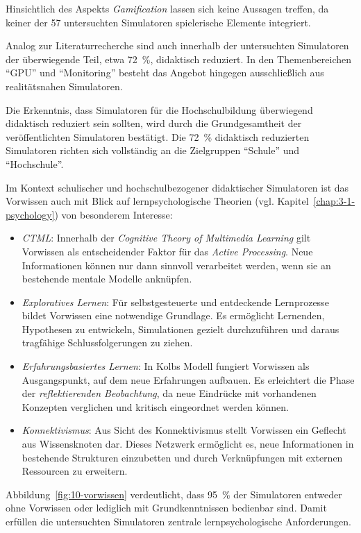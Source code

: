 Hinsichtlich des Aspekts \textit{Gamification} lassen sich keine Aussagen treffen, da keiner der 57 untersuchten Simulatoren spielerische Elemente integriert.

Analog zur Literaturrecherche sind auch innerhalb der untersuchten Simulatoren der überwiegende Teil, etwa 72~\%, didaktisch reduziert. In den Themenbereichen \enquote{GPU} und \enquote{Monitoring} besteht das Angebot hingegen ausschließlich aus realitätsnahen Simulatoren.

Die Erkenntnis, dass Simulatoren für die Hochschulbildung überwiegend didaktisch reduziert sein sollten, wird durch die Grundgesamtheit der veröffentlichten Simulatoren bestätigt. Die 72~\% didaktisch reduzierten Simulatoren richten sich vollständig an die Zielgruppen \enquote{Schule} und \enquote{Hochschule}.

Im Kontext schulischer und hochschulbezogener didaktischer Simulatoren ist das Vorwissen auch mit Blick auf lernpsychologische Theorien (vgl. Kapitel~\ref{chap:3-1-psychology}) von besonderem Interesse:

\begin{itemize}
    \item \textit{\ac{CTML}}: Innerhalb der \textit{Cognitive Theory of Multimedia Learning} gilt Vorwissen als entscheidender Faktor für das \textit{Active Processing}. Neue Informationen können nur dann sinnvoll verarbeitet werden, wenn sie an bestehende mentale Modelle anknüpfen.
    \item \textit{Exploratives Lernen}: Für selbstgesteuerte und entdeckende Lernprozesse bildet Vorwissen eine notwendige Grundlage. Es ermöglicht Lernenden, Hypothesen zu entwickeln, Simulationen gezielt durchzuführen und daraus tragfähige Schlussfolgerungen zu ziehen.
    \item \textit{Erfahrungsbasiertes Lernen}: In Kolbs Modell fungiert Vorwissen als Ausgangspunkt, auf dem neue Erfahrungen aufbauen. Es erleichtert die Phase der \textit{reflektierenden Beobachtung}, da neue Eindrücke mit vorhandenen Konzepten verglichen und kritisch eingeordnet werden können.
    \item \textit{Konnektivismus}: Aus Sicht des Konnektivismus stellt Vorwissen ein Geflecht aus Wissensknoten dar. Dieses Netzwerk ermöglicht es, neue Informationen in bestehende Strukturen einzubetten und durch Verknüpfungen mit externen Ressourcen zu erweitern.
\end{itemize}

Abbildung~\ref{fig:10-vorwissen} verdeutlicht, dass 95~\% der Simulatoren entweder ohne Vorwissen oder lediglich mit Grundkenntnissen bedienbar sind. Damit erfüllen die untersuchten Simulatoren zentrale lernpsychologische Anforderungen.

